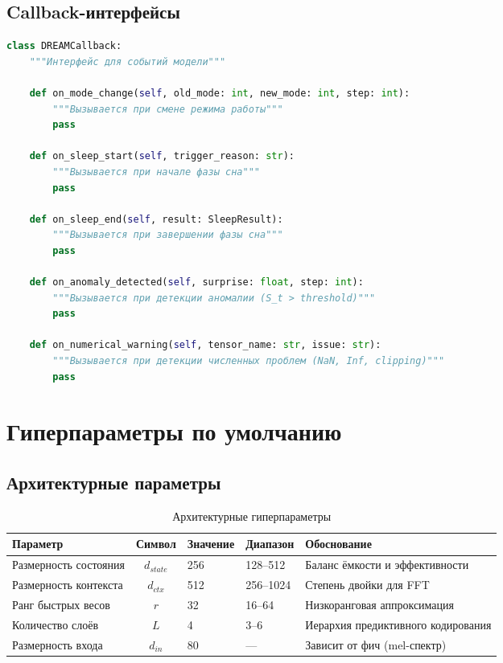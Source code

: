 \subsection{Callback-интерфейсы}

\begin{lstlisting}[language=Python, caption={Callback-интерфейсы}, label={lst:callbacks}]
class DREAMCallback:
    """Интерфейс для событий модели"""

    def on_mode_change(self, old_mode: int, new_mode: int, step: int):
        """Вызывается при смене режима работы"""
        pass

    def on_sleep_start(self, trigger_reason: str):
        """Вызывается при начале фазы сна"""
        pass

    def on_sleep_end(self, result: SleepResult):
        """Вызывается при завершении фазы сна"""
        pass

    def on_anomaly_detected(self, surprise: float, step: int):
        """Вызывается при детекции аномалии (S_t > threshold)"""
        pass

    def on_numerical_warning(self, tensor_name: str, issue: str):
        """Вызывается при детекции численных проблем (NaN, Inf, clipping)"""
        pass
\end{lstlisting}

\section{Гиперпараметры по умолчанию}

\subsection{Архитектурные параметры}

\begin{table}[h]
\centering
\caption{Архитектурные гиперпараметры}
\label{tab:hyper_arch}
\begin{tabular}{lcp{2cm}p{2.5cm}p{4cm}}
\toprule
\textbf{Параметр} & \textbf{Символ} & \textbf{Значение} & \textbf{Диапазон} & \textbf{Обоснование} \\
\midrule
Размерность состояния & $d_{state}$ & 256 & 128–512 & Баланс ёмкости и эффективности \\
Размерность контекста & $d_{ctx}$ & 512 & 256–1024 & Степень двойки для FFT \\
Ранг быстрых весов & $r$ & 32 & 16–64 & Низкоранговая аппроксимация \\
Количество слоёв & $L$ & 4 & 3–6 & Иерархия предиктивного кодирования \\
Размерность входа & $d_{in}$ & 80 & --- & Зависит от фич (mel-спектр) \\
\bottomrule
\end{tabular}
\end{table}

